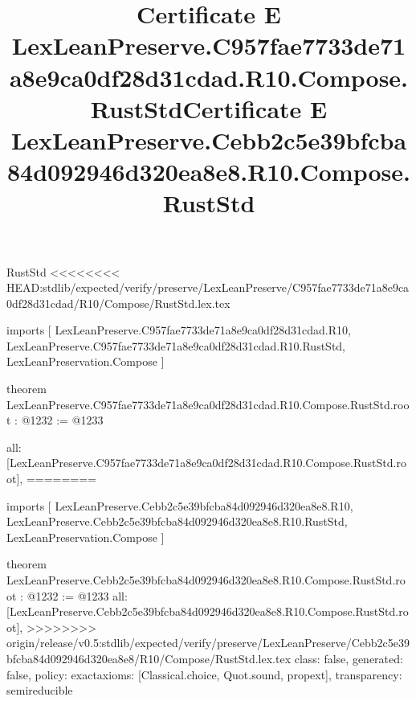 \begin{lexlean}{RustStd}
<<<<<<<< HEAD:stdlib/expected/verify/preserve/LexLeanPreserve/C957fae7733de71a8e9ca0df28d31cdad/R10/Compose/RustStd.lex.tex
\title{Certificate E LexLeanPreserve.C957fae7733de71a8e9ca0df28d31cdad.R10.Compose.RustStd}
\begin{coremodule}
imports [
  LexLeanPreserve.C957fae7733de71a8e9ca0df28d31cdad.R10,
  LexLeanPreserve.C957fae7733de71a8e9ca0df28d31cdad.R10.RustStd,
  LexLeanPreservation.Compose
]

theorem LexLeanPreserve.C957fae7733de71a8e9ca0df28d31cdad.R10.Compose.RustStd.root : @1232 := @1233 {
  all: [LexLeanPreserve.C957fae7733de71a8e9ca0df28d31cdad.R10.Compose.RustStd.root],
========
\title{Certificate E LexLeanPreserve.Cebb2c5e39bfcba84d092946d320ea8e8.R10.Compose.RustStd}
\begin{coremodule}
imports [
  LexLeanPreserve.Cebb2c5e39bfcba84d092946d320ea8e8.R10,
  LexLeanPreserve.Cebb2c5e39bfcba84d092946d320ea8e8.R10.RustStd,
  LexLeanPreservation.Compose
]

theorem LexLeanPreserve.Cebb2c5e39bfcba84d092946d320ea8e8.R10.Compose.RustStd.root : @1232 := @1233 {
  all: [LexLeanPreserve.Cebb2c5e39bfcba84d092946d320ea8e8.R10.Compose.RustStd.root],
>>>>>>>> origin/release/v0.5:stdlib/expected/verify/preserve/LexLeanPreserve/Cebb2c5e39bfcba84d092946d320ea8e8/R10/Compose/RustStd.lex.tex
  class: false,
  generated: false,
  policy: exact{axioms: [Classical.choice, Quot.sound, propext]},
  transparency: semireducible
}


\end{coremodule}}
\end{coremodule}
\end{lexlean}
